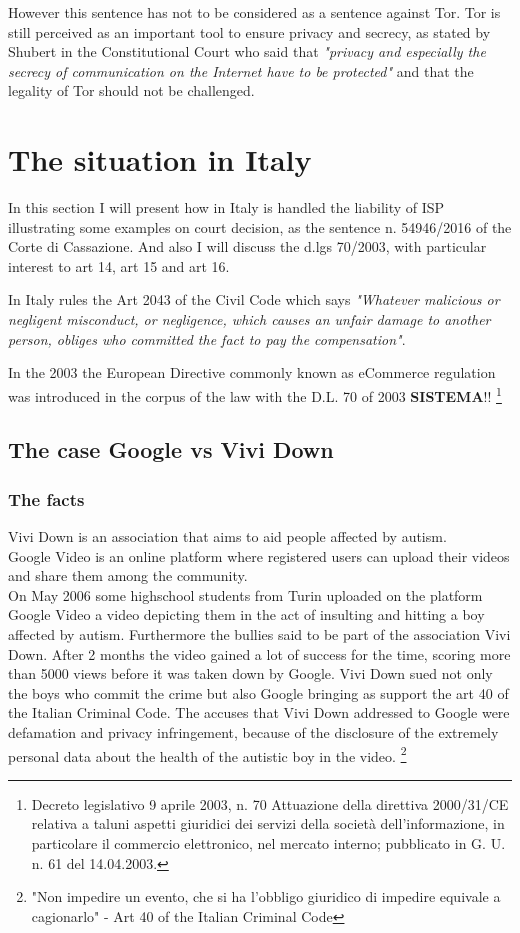 \documentclass[runningheads,a4paper]{llncs}
\begin{document}
However this sentence has not to be considered as a sentence against Tor. Tor is still perceived as an important tool to ensure privacy and secrecy, as stated by  Shubert in the Constitutional Court who said that \textit{"privacy and especially the secrecy of communication on the Internet have to be protected"} and that the legality of Tor should not be challenged. \cite{PCW}

\section{The situation in Italy} 
In this section I will present how in Italy is handled the liability of ISP illustrating some examples on court decision, as the sentence n. 54946/2016 of the Corte di Cassazione. And also I will discuss the d.lgs 70/2003, with particular interest to art 14, art 15 and art 16.

In Italy rules the Art 2043 of the Civil Code which says \textit{"Whatever malicious or negligent misconduct, or negligence, which causes an unfair damage to another person, obliges who committed the fact to pay the compensation"}. 

In the 2003 the European Directive commonly known as eCommerce regulation was introduced in the corpus of the law with the D.L. 70 of 2003 \textbf{SISTEMA}!!
\footnote{Decreto legislativo 9 aprile 2003, n. 70 Attuazione della direttiva 2000/31/CE relativa a taluni aspetti giuridici dei servizi della società dell'informazione, in particolare il commercio elettronico, nel
mercato interno; pubblicato in G. U. n. 61 del 14.04.2003.
}
\subsection{The case Google vs Vivi Down}
\subsubsection{The facts}
Vivi Down is an association that aims to aid people affected by autism.\\ 
Google Video is an online platform where registered users can upload their videos and share them among the community. \\ 
On May 2006 some highschool students from Turin uploaded on the platform Google Video a video depicting them in the act of insulting and hitting a boy affected by autism. Furthermore the bullies said to be part of the association Vivi Down. After 2 months the video gained a lot of success for the time, scoring more than 5000 views before it was taken down by Google. 
Vivi Down sued not only the boys who commit the crime but also Google bringing as support the art 40 of the Italian Criminal Code.
The accuses that Vivi Down addressed to Google were defamation and privacy infringement, because of the disclosure of the extremely personal data about the health of the autistic boy in the video.
\footnote{"Non impedire un evento, che si ha l'obbligo giuridico di impedire equivale a cagionarlo" - Art 40 of the Italian Criminal Code}
\end{document}
